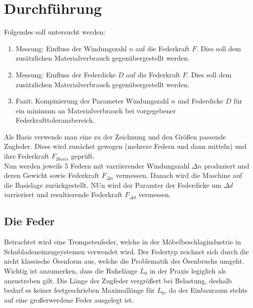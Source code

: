 \newpage
\section{Durchführung}
Folgendes soll untersucht werden:
\begin{enumerate}
    \item Messung: Einfluss der Windungszahl $n$ auf die Federkraft $F$. Dies soll dem zusätzlichen
    Materialverbrauch gegenübergestellt werden.
    \item Messung: Einfluss der Federdicke $D$ auf die Federkraft $F$. Dies soll dem zusätzlichen
    Materialverbrauch gegenübergestellt werden.
    \item Fazit: Kompinierung der Parameter Windungszahl $n$ und Federdicke $D$ für ein minimum
    an Materialverbrauch bei vorgegebener Federkrafttoleranzbereich.
\end{enumerate}
Als Basis verwende man eine zu der Zeichnung und den Größen passende Zugfeder. Diese
wird zunächst gewogen (mehrere Federn und dann mitteln) und ihre Federkraft $F_{Basis}$
geprüft.\\
Nun werden jeweils 5 Federn mit varriierender Windungszahl $\Delta n$ produziert und deren
Gewicht sowie Federkraft $F_{\Delta n}$ vermessen.
Danach wird die Maschine auf die Basislage zurückgestellt. NUn wird der Paramter 
der Federdicke um $\Delta d$ varrieriert und resultierende Federkraft $F_{\Delta d}$
vermessen.  

\newpage

\subsection{Die Feder}

Betrachtet wird eine Trompetenfeder, welche in der Möbelbeschlagindustrie in Schubladeneinzugsystemen
verwendet wird. 
Der Federtyp zeichnet sich durch die nicht klassische Ösenform aus, welche die Problematik des Ösenbruchs umgeht.\\

Wichtig ist anzumerken, dass die Ruhelänge $L_0$ in der Praxis legiglich als anzustreben gilt.
Die Länge der Zugfeder vergrößert bei Belastung, deshalb bedarf es keiner festgeschrieben Maximallänge für $L_0$, da
der Einbauraum stehts auf eine großerwerdene Feder ausgelegt ist.  
\newline

